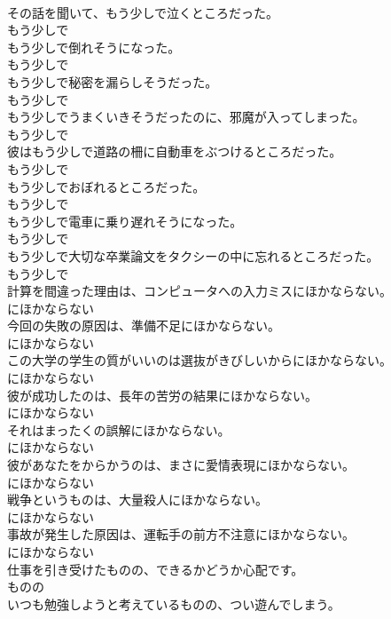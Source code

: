 \documentclass[8pt]{extreport}
\begin{document}
\begin{CJK}{UTF8}{min}
\\	その話を聞いて、もう少しで泣くところだった。	
\\	もう少しで
\\	もう少しで倒れそうになった。	
\\	もう少しで
\\	もう少しで秘密を漏らしそうだった。	
\\	もう少しで
\\	もう少しでうまくいきそうだったのに、邪魔が入ってしまった。	
\\	もう少しで
\\	彼はもう少しで道路の柵に自動車をぶつけるところだった。	
\\	もう少しで
\\	もう少しでおぼれるところだった。	
\\	もう少しで
\\	もう少しで電車に乗り遅れそうになった。	
\\	もう少しで
\\	もう少しで大切な卒業論文をタクシーの中に忘れるところだった。	
\\	もう少しで
\\	計算を間違った理由は、コンピュータへの入力ミスにほかならない。	
\\	にほかならない
\\	今回の失敗の原因は、準備不足にほかならない。	
\\	にほかならない
\\	この大学の学生の質がいいのは選抜がきびしいからにほかならない。	
\\	にほかならない
\\	彼が成功したのは、長年の苦労の結果にほかならない。	
\\	にほかならない
\\	それはまったくの誤解にほかならない。	
\\	にほかならない
\\	彼があなたをからかうのは、まさに愛情表現にほかならない。	
\\	にほかならない
\\	戦争というものは、大量殺人にほかならない。	
\\	にほかならない
\\	事故が発生した原因は、運転手の前方不注意にほかならない。	
\\	にほかならない
\\	仕事を引き受けたものの、できるかどうか心配です。	
\\	ものの
\\	いつも勉強しようと考えているものの、つい遊んでしまう。	

\end{CJK}
\end{document}
